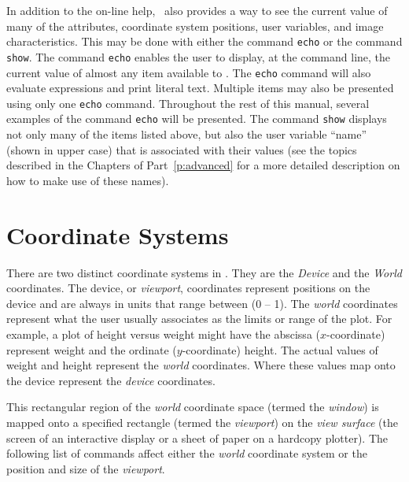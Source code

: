 In addition to the on-line help, \wip\ also provides a way to see the
current value of many
of the attributes,
coordinate system positions,
user variables, and
image characteristics.
This may be done with either the command
{\tt echo} or the command
{\tt show}.
The command {\tt echo} enables the user to display, at the command line,
the current value of almost any item available to \wip.
The {\tt echo} command will also evaluate expressions and print literal text.
Multiple items may also be presented using only one {\tt echo} command.
Throughout the rest of this manual, several examples of the command {\tt echo}
will be presented.
The command {\tt show} displays not only many of the items listed above,
but also the user variable ``name'' (shown in upper case) that
is associated with their values
(see the topics described in the Chapters of Part~\ref{p:advanced}
for a more detailed description on how to make use of these names).

\section{Coordinate Systems}

There are two distinct coordinate systems in \wip.
They are the
{\em Device}
and the
{\em World}%
coordinates.
The device, or {\em viewport}, coordinates represent positions on the
device and are always in units that range between (0 -- 1).
The {\em world} coordinates represent what the
user usually associates as the limits or range of the plot.
For example, a plot of height versus weight might have
the abscissa ($x$-coordinate) represent weight
and the ordinate ($y$-coordinate) height.
The actual values of weight and height represent
the {\em world} coordinates.
Where these values map onto the device represent
the {\em device} coordinates.

This rectangular region of the {\em world} coordinate space
(termed the {\em window})
is mapped onto a specified rectangle
(termed the {\em viewport})
on the 
{\em view surface}
(the screen of an interactive display or a sheet of paper on a hardcopy
plotter).
The following list of commands affect either the
{\em world} coordinate system or the position and size of the {\em viewport}.

